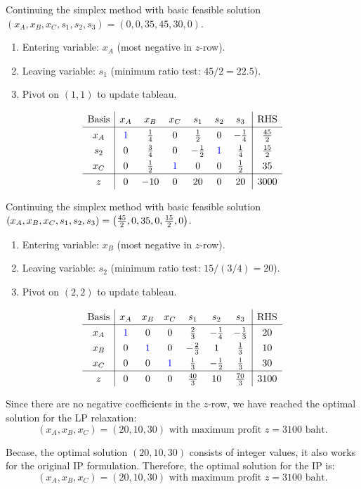 \documentclass[a4paper, 10pt]{article}
\begin{document}
\begin{solution}
Continuing the simplex method with basic feasible solution \( (x_A, x_B, x_C, s_1, s_2, s_3) = (0, 0, 35, 45, 30, 0) \).
\begin{enumerate}
    \item Entering variable: \( x_A \) (most negative in \( z \)-row).
    \item Leaving variable: \( s_1 \) (minimum ratio test: \( 45/2 = 22.5 \)).
    \item Pivot on \( (1,1) \) to update tableau.
\end{enumerate}
\[
\renewcommand{\arraystretch}{1.3}
\begin{array}{c|cccccc|c}
\text{Basis} & x_A & x_B & x_C & s_1 & s_2 & s_3 & \text{RHS} \\
\hline
x_A & \textcolor[HTML]{0000FF}{1} & \frac{1}{4} & 0 & \frac{1}{2} & 0 & -\frac{1}{4} & \frac{45}{2} \\
s_2 & 0 & \frac{3}{4} & 0 & -\frac{1}{2} & \textcolor[HTML]{0000FF}{1} & \frac{1}{4} & \frac{15}{2} \\
x_C & 0 & \frac{1}{2} & \textcolor[HTML]{0000FF}{1} & 0 & 0 & \frac{1}{2} & 35 \\
\hline
z & 0 & -10 & 0 & 20 & 0 & 20 & 3000 \\
\end{array}
\]

Continuing the simplex method with basic feasible solution \( (x_A, x_B, x_C, s_1, s_2, s_3) = \left( \frac{45}{2}, 0, 35, 0, \frac{15}{2}, 0 \right) \).
\begin{enumerate}
    \item Entering variable: \( x_B \) (most negative in \( z \)-row).
    \item Leaving variable: \( s_2 \) (minimum ratio test: \( 15/ (3/4) = 20 \)).
    \item Pivot on \( (2,2) \) to update tableau.
\end{enumerate}
\[
\renewcommand{\arraystretch}{1.3}
\begin{array}{c|cccccc|c}
\text{Basis} & x_A & x_B & x_C & s_1 & s_2 & s_3 & \text{RHS} \\
\hline
x_A & \textcolor[HTML]{0000FF}{1} & 0 & 0 & \frac{2}{3} & -\frac{1}{4} & -\frac{1}{3} & 20 \\
x_B & 0 & \textcolor[HTML]{0000FF}{1} & 0 & -\frac{2}{3} & 1 & \frac{1}{3} & 10 \\
x_C & 0 & 0 & \textcolor[HTML]{0000FF}{1} & \frac{1}{3} & -\frac{1}{2} & \frac{1}{3} & 30 \\
\hline
z & 0 & 0 & 0 & \frac{40}{3} & 10 & \frac{70}{3} & 3100 \\
\end{array}
\]

Since there are no negative coefficients in the \( z \)-row, we have reached the optimal solution for the LP relaxation:
\[ (x_A, x_B, x_C) = (20, 10, 30) \text{ with maximum profit } z = 3100 \text{ baht}. \]

Becase, the optimal solution \( (20, 10, 30) \) consists of integer values, it also works for the original IP formulation.
Therefore, the optimal solution for the IP is:
\[ \boxed{ (x_A, x_B, x_C) = (20, 10, 30) \text{ with maximum profit } z = 3100 \text{ baht}. } \]
\end{solution}
\end{document}
